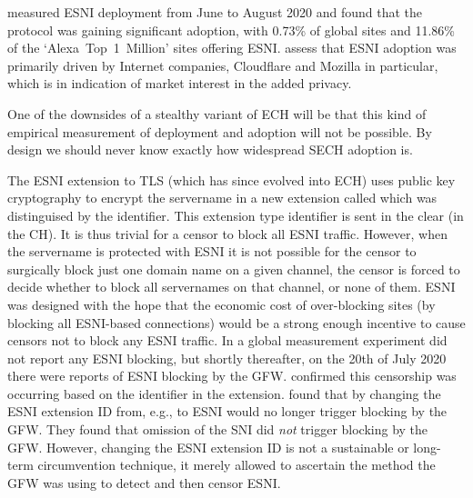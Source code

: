 

\cite{guan2021largescalemeasurementofesni} measured \ac{ESNI} deployment from June to August 2020 and found that the protocol was gaining significant adoption, with 0.73\% of global sites and 11.86\% of the `Alexa~Top~1~Million' sites offering \ac{ESNI}. \cite{guan2021largescalemeasurementofesni} assess that \ac{ESNI} adoption was primarily driven by Internet companies, Cloudflare and Mozilla in particular, which is in indication of market interest in the added privacy.

One of the downsides of a stealthy variant of \ac{ECH} will be that this kind of
empirical measurement of deployment and adoption will not be possible.
By design we should never know exactly how widespread \ac{SECH} adoption is.

The \ac{ESNI} extension to \ac{TLS} (which has since evolved into \ac{ECH}) uses public key cryptography to encrypt the servername in a new extension called  which was distinguised by the   identifier.
This extension type identifier is sent in the clear (in the \ac{CH}).
It is thus trivial for a censor to block all \ac{ESNI} traffic.
However, when the servername is protected with \ac{ESNI} it is not possible for the censor to surgically block just one domain name on a given channel, the censor is forced to decide whether to block all servernames on that channel, or none of them.
\ac{ESNI} was designed with the hope that the economic cost of over-blocking sites
(by blocking all \ac{ESNI}-based connections)
would be a strong enough incentive to cause censors not to block any \ac{ESNI} traffic.
In a global measurement experiment \cite{chai2019importance} did not report any \ac{ESNI} blocking,
but shortly thereafter,
on the 20th of July 2020 there were reports of \ac{ESNI} blocking by the \ac{GFW}.
\cite{bock2020censorship} confirmed this censorship was occurring based on the  identifier in the  extension.
\cite{bock2020censorship} found that by changing the \ac{ESNI} extension ID from,
e.g.,  to  \ac{ESNI} would no longer trigger blocking by the \ac{GFW}.
They found that omission of the \ac{SNI} did {\em not} trigger blocking by the \ac{GFW}.
However, changing the \ac{ESNI} extension ID is not a sustainable or long-term circumvention technique,
it merely allowed \cite{bock2020censorship} to ascertain
the method the \ac{GFW} was using to detect and then censor \ac{ESNI}.

